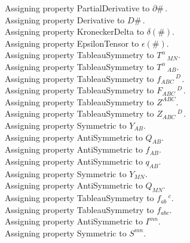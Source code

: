 \documentclass[11pt]{article}
\begin{document}
Assigning property PartialDerivative to $\partial{\#}\, $.
\\
Assigning property Derivative to $D{\#}\, $.
\\
Assigning property KroneckerDelta to $\delta(\#)$.
\\
Assigning property EpsilonTensor to $\epsilon(\#)$.
\\
Assigning property TableauSymmetry to ${T}^{\alpha}\,_{M N}$.
\\
Assigning property TableauSymmetry to ${T}^{\alpha}\,_{A B}$.
\\
Assigning property TableauSymmetry to ${f}_{A B C}\,^{D\, }$.
\\
Assigning property TableauSymmetry to ${F}_{A B C}\,^{D\, }$.
\\
Assigning property TableauSymmetry to ${Z}^{A B C}$.
\\
Assigning property TableauSymmetry to ${Z}_{A B C}\,^{D\, }$.
\\
Assigning property Symmetric to ${Y}_{A B}$.
\\
Assigning property AntiSymmetric to ${Q}_{A B}$.
\\
Assigning property AntiSymmetric to ${f}_{A B}$.
\\
Assigning property AntiSymmetric to ${q}_{A B}$.
\\
Assigning property Symmetric to ${Y}_{M N}$.
\\
Assigning property AntiSymmetric to ${Q}_{M N}$.
\\
Assigning property TableauSymmetry to ${f}_{a b}\,^{c}$.
\\
Assigning property TableauSymmetry to ${f}_{a b c}$.
\\
Assigning property AntiSymmetric to ${I}^{m n}$.
\\
Assigning property Symmetric to ${S}^{m n}$.
\end{document}
